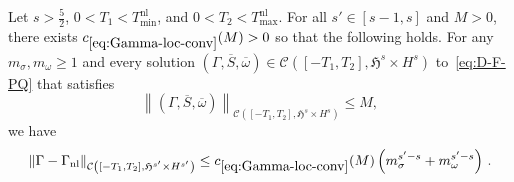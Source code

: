 \documentclass[AHL,Unicode,longabstracts,published]{cedram}
\newcommand{\nl}{\mathrm{nl}}
\newcommand{\cC}{\mathcal{C}}
\newcommand{\gH}{\mathfrak{H}}
\begin{document}
\begin{prop}\label{prop.conv-mb}
Let $s>\tfrac52$, $0<T_1<T_{\min}^{\nl}$, and $0<T_2<T_{\max}^{\nl}$. For all $s'\in[s-1,s]$ and $M>0$, there exists $c_{\eqref{eq:Gamma-loc-conv}}(M)>0$ so that the following holds. For any $m_\sigma, m_\omega\geq 1$ and every solution $(\Gamma, \overline{S}, \overline{\omega})\in\cC([-T_1,T_2],\gH^s\times H^s)$ to~\eqref{eq:D-F-PQ} that satisfies
\begin{equation*}
\left\|(\Gamma, \overline{S}, \overline{\omega})\right\|_{\cC\left([-T_1,T_2],\gH^s\times H^s\right)}\leq M,
\end{equation*}
we have
\begin{equation}\label{eq:Gamma-loc-conv}
\|\Gamma-\Gamma_{\nl}\|_{\cC\left([-T_1,T_2],\gH^{s'}\times H^{s'}\right)}\leq c_{\eqref{eq:Gamma-loc-conv}}(M)\left(m_\sigma^{s'-s}+m_{\omega}^{s'-s} \right)\,.
\end{equation}
\end{prop}
\end{document}
